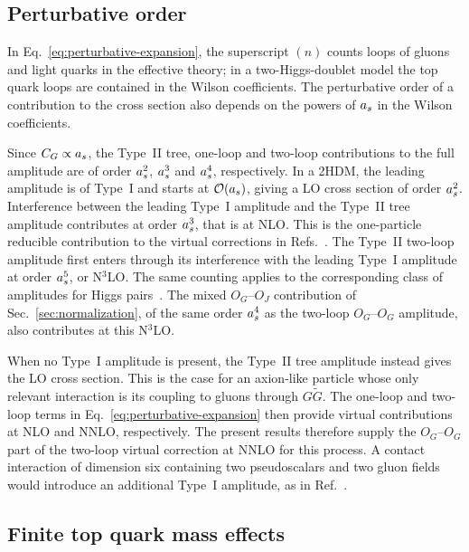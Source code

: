 \subsection{Perturbative order}
\label{sec:counting}

In Eq.~\eqref{eq:perturbative-expansion}, the superscript $(n)$ counts loops of gluons and light quarks in the effective theory; in a two-Higgs-doublet model the top quark loops are contained in the Wilson coefficients.
The perturbative order of a contribution to the cross
section also depends on the powers of $a_s$ in the Wilson
coefficients.

Since $C_G\propto a_s$, the Type~II tree, one-loop and
two-loop contributions to the full amplitude are of
order $a_s^2$, $a_s^3$ and $a_s^4$, respectively.
In a 2HDM, the leading amplitude is of Type~I and
starts at $\mathcal{O}(a_s)$, giving a LO cross section
of order $a_s^2$. Interference between the leading
Type~I amplitude and the Type~II tree amplitude
contributes at order $a_s^3$, that is at NLO.
This is the one-particle reducible contribution to
the virtual corrections in
Refs.~\cite{DawsonDittmaierSpira1998,Baglio:2023euv}.
The Type~II two-loop amplitude first enters through
its interference with the leading Type~I amplitude
at order $a_s^5$, or N$^3$LO. The same counting
applies to the corresponding class of amplitudes
for Higgs pairs~\cite{Banerjee:2018lfq}.
The mixed $O_G$--$O_J$ contribution of Sec.~\ref{sec:normalization}, of the same order $a_s^4$ as the two-loop $O_G$--$O_G$ amplitude, also contributes at this N$^3$LO.

When no Type~I amplitude is present, the Type~II
tree amplitude instead gives the LO cross section.
This is the case for an axion-like particle whose
only relevant interaction is its coupling to gluons
through $G\tilde G$. The one-loop and two-loop
terms in Eq.~\eqref{eq:perturbative-expansion}
then provide virtual contributions at NLO and
NNLO, respectively. The present results therefore
supply the $O_G$--$O_G$ part of the two-loop virtual
correction at NNLO for this process. A contact
interaction of dimension six containing two
pseudoscalars and two gluon fields would introduce
an additional Type~I amplitude, as in
Ref.~\cite{Brivio:2026alp}.


\subsection{Finite top quark mass effects}


